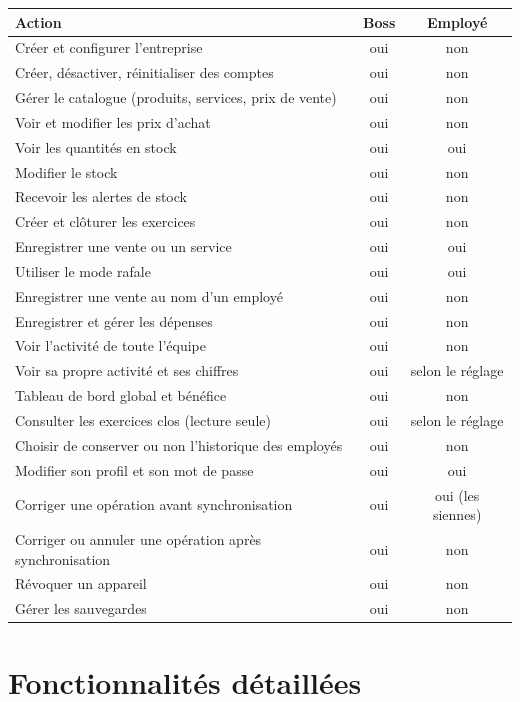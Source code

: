 \documentclass[11pt,a4paper]{article}
\begin{document}
	\begin{center}
		\small
		\begin{tabular}{p{7.2cm} c c}
			\toprule
			\textbf{Action} & \textbf{Boss} & \textbf{Employé} \\
			\midrule
			Créer et configurer l'entreprise & oui & non \\
			Créer, désactiver, réinitialiser des comptes & oui & non \\
			Gérer le catalogue (produits, services, prix de vente) & oui & non \\
			Voir et modifier les prix d'achat & oui & non \\
			Voir les quantités en stock & oui & oui \\
			Modifier le stock & oui & non \\
			Recevoir les alertes de stock & oui & non \\
			Créer et clôturer les exercices & oui & non \\
			Enregistrer une vente ou un service & oui & oui \\
			Utiliser le mode rafale & oui & oui \\
			Enregistrer une vente au nom d'un employé & oui & non \\
			Enregistrer et gérer les dépenses & oui & non \\
			Voir l'activité de toute l'équipe & oui & non \\
			Voir sa propre activité et ses chiffres & oui & selon le réglage \\
			Tableau de bord global et bénéfice & oui & non \\
			Consulter les exercices clos (lecture seule) & oui & selon le réglage \\
			Choisir de conserver ou non l'historique des employés & oui & non \\
			Modifier son profil et son mot de passe & oui & oui \\
			Corriger une opération avant synchronisation & oui & oui (les siennes) \\
			Corriger ou annuler une opération après synchronisation & oui & non \\
			Révoquer un appareil & oui & non \\
			Gérer les sauvegardes & oui & non \\
			\bottomrule
		\end{tabular}
	\end{center}
	
	\section{Fonctionnalités détaillées}
	
\end{document}
